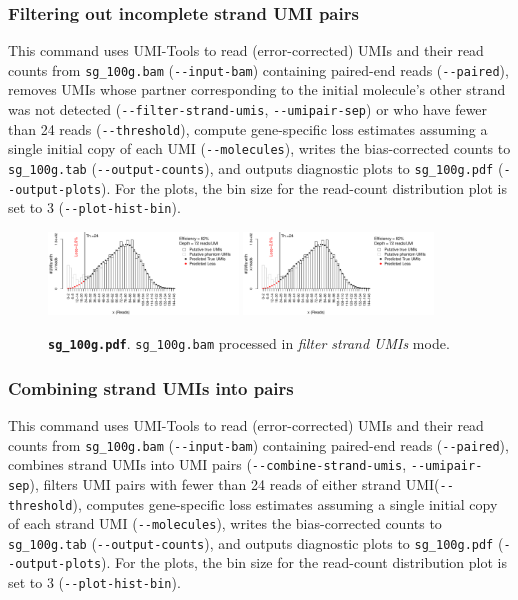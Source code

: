 \documentclass[a4paper]{scrartcl}
\newcommand{\shellscript}[1]{\bgroup\topsep=0pt\partopsep=0pt\shaded%
	\endshaded\egroup}
\newcommand{\ddarg}[1]{\texttt{-{}-#1}}
\begin{document}
\subsubsection*{Filtering out incomplete strand UMI pairs}

\shellscript{../examples/sg_100g.cmd}

This command uses UMI-Tools to read (error-corrected) UMIs and their read counts from \texttt{sg\_100g.bam} (\ddarg{input-bam}) containing paired-end reads (\ddarg{paired}), removes UMIs whose partner corresponding to the initial molecule's other strand was not detected (\ddarg{filter-strand-umis}, \ddarg{umipair-sep}) or who have fewer than 24 reads (\ddarg{threshold}), compute gene-specific loss estimates assuming a single initial copy of each UMI (\ddarg{molecules}), writes the bias-corrected counts to \texttt{sg\_100g.tab} (\ddarg{output-counts}), and outputs diagnostic plots to \texttt{sg\_100g.pdf} (\ddarg{output-plots}). For the plots, the bin size for the read-count distribution plot is set to 3 (\ddarg{plot-hist-bin}).

\begin{figure}[H]
{\centering
\includegraphics[width=0.45\textwidth,page=1]{../examples/sg_100g.pdf}\hfill
\includegraphics[width=0.45\textwidth,page=2]{../examples/sg_100g.pdf}
\\}
\caption*{\textbf{\texttt{sg\_100g.pdf}}. \texttt{sg\_100g.bam} processed in \emph{filter strand UMIs} mode.}
\end{figure}

\subsubsection*{Combining strand UMIs into pairs}

\shellscript{../examples/sg_100g_comb.cmd}

\enlargethispage{5\baselineskip}
This command uses UMI-Tools to read (error-corrected) UMIs and their read counts from \texttt{sg\_100g.bam} (\ddarg{input-bam}) containing paired-end reads (\ddarg{paired}), combines strand UMIs into UMI pairs (\ddarg{combine-strand-umis}, \ddarg{umipair-sep}), filters UMI pairs with fewer than 24 reads of either strand UMI(\ddarg{threshold}), computes gene-specific loss estimates assuming a single initial copy of each strand UMI (\ddarg{molecules}), writes the bias-corrected counts to \texttt{sg\_100g.tab} (\ddarg{output-counts}), and outputs diagnostic plots to \texttt{sg\_100g.pdf} (\ddarg{output-plots}). For the plots, the bin size for the read-count distribution plot is set to 3 (\ddarg{plot-hist-bin}).
\end{document}
